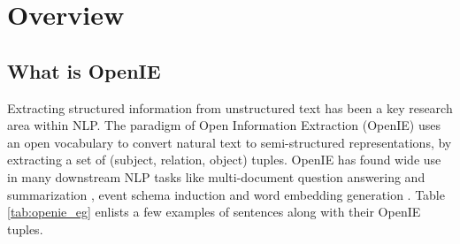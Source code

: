 \section{Overview}
  \subsection{What is OpenIE}

  Extracting structured information from unstructured text has been a key research area within NLP. The paradigm of Open Information Extraction (OpenIE) \cite{banko&al07} uses an open vocabulary to convert natural text to semi-structured representations, by extracting a set of (subject, relation, object) tuples. OpenIE has found wide use in many downstream NLP tasks \cite{mausam16} like multi-document question answering and summarization \cite{fan&al19}, event schema induction \cite{balasubramanian-emnlp13} and word embedding generation \cite{stanovsky&al15}. Table \ref{tab:openie_eg} enlists a few examples of sentences along with their OpenIE tuples.
  
